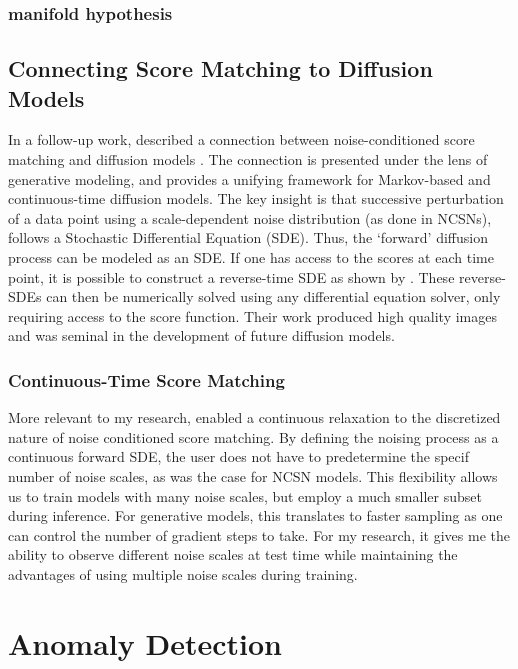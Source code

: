 \subsubsection{manifold hypothesis}

\subsection{Connecting Score Matching to Diffusion Models}

In a follow-up work,  described a connection between noise-conditioned score matching and diffusion models . The connection is presented under the lens of generative modeling, and provides a unifying framework for Markov-based and continuous-time diffusion models. The key insight is that successive perturbation of a data point using a scale-dependent noise distribution (as done in NCSNs), follows a Stochastic Differential Equation (SDE). Thus, the `forward' diffusion process can be modeled as an SDE. If one has access to the scores at each time point, it is possible to construct a reverse-time SDE as shown by \cite{anderson1982reverse}. These reverse-SDEs can then be numerically solved using any differential equation solver, only requiring access to the score function. Their work produced high quality images and was seminal in the development of future diffusion models.

\subsubsection*{Continuous-Time Score Matching}
More relevant to my research,  enabled a continuous relaxation to the discretized nature of noise conditioned score matching. By defining the noising process as a continuous forward SDE, the user does not have to predetermine the specif number of noise scales, as was the case for NCSN models. This flexibility allows us to train models with many noise scales, but employ a much smaller subset during inference. For generative models, this translates to faster sampling as one can control the number of gradient steps to take. For my research, it gives me the ability to observe different noise scales at test time while maintaining the advantages of using multiple noise scales during training.


\section{Anomaly Detection}


